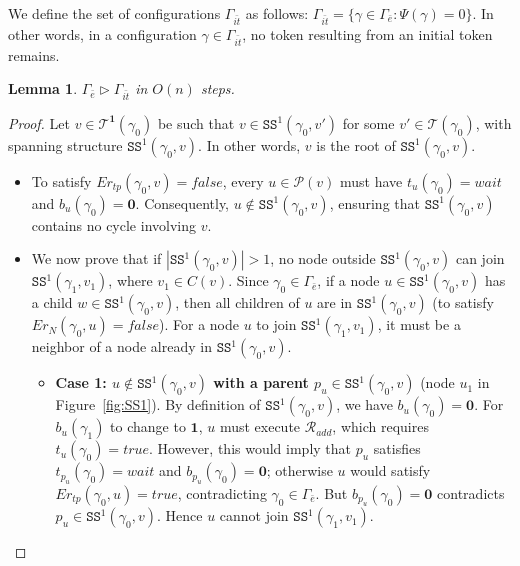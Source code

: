 \documentclass[a4paper, 12pt]{article}
\newtheorem{lemma}[theorem]{Lemma}
\newcommand{\Pa}{\mathcal{P}}
\newcommand{\bz}{\mathbf{0}}
\newcommand{\bo}{\mathbf{1}}
\newcommand{\Ss}{\texttt{SS}^1}
\newcommand{\Radd}{$\mathscr{R}_{add}$}
\begin{document}
We define the set of configurations $\Gamma_{\bar{it}}$ as follows: 
$\Gamma_{\bar{it}} = \{\gamma \in \Gamma_{\bar{e}} : \Psi(\gamma) = 0\}$. 
In other words, in a configuration $\gamma \in \Gamma_{\bar{it}}$, no token 
resulting from an initial token remains.

\begin{lemma}
\label{lem:CleanBadToken}
$\Gamma_{\bar{e}} \triangleright \Gamma_{\bar{it}}$ in $O(n)$ steps.
\end{lemma}

\begin{proof}
Let $v \in \mathcal{T}^{\bo}(\gamma_0)$ be such that 
$v \in \Ss(\gamma_0, v')$ for some $v' \in \mathcal{T}(\gamma_0)$, 
with spanning structure $\Ss(\gamma_0, v)$. In other words, $v$ 
is the root of $\Ss(\gamma_0, v)$.

\begin{itemize}

\item To satisfy $Er_{tp}(\gamma_0, v) = \mathit{false}$, every 
$u \in \Pa(v)$ must have $t_u(\gamma_0) = \mathit{wait}$ and 
$b_u(\gamma_0) = \bz$. Consequently, $u \notin \Ss(\gamma_0, v)$, 
ensuring that $\Ss(\gamma_0, v)$ contains no cycle involving $v$.

\item We now prove that if $|\Ss(\gamma_0, v)| > 1$, no node 
outside $\Ss(\gamma_0, v)$ can join $\Ss(\gamma_1, v_1)$, 
where $v_1 \in C(v)$. Since $\gamma_0 \in \Gamma_{\bar{e}}$, if a node 
$u \in \Ss(\gamma_0, v)$ has a child $w \in \Ss(\gamma_0, v)$, 
then all children of $u$ are in $\Ss(\gamma_0, v)$ (to satisfy 
$Er_{N}(\gamma_0, u) = \mathit{false}$). For a node $u$ to join 
$\Ss(\gamma_1, v_1)$, it must be a neighbor of a node already 
in $\Ss(\gamma_0, v)$.

\begin{itemize}

    \item \textbf{Case 1: $u \notin \Ss(\gamma_0, v)$ with a 
    parent $p_u \in \Ss(\gamma_0, v)$} (node $u_1$ in 
    Figure~\ref{fig:SS1}). By definition of $\Ss(\gamma_0, v)$, 
    we have $b_u(\gamma_0) = \bz$. For $b_u(\gamma_1)$ to change to 
    $\bo$, $u$ must execute \Radd, which requires $t_u(\gamma_0) = 
    \mathit{true}$. However, this would imply that $p_u$ satisfies 
    $t_{p_u}(\gamma_0) = \mathit{wait}$ and $b_{p_u}(\gamma_0) = \bz$; 
    otherwise $u$ would satisfy $Er_{tp}(\gamma_0, u) = \mathit{true}$, 
    contradicting $\gamma_0 \in \Gamma_{\bar{e}}$. But 
    $b_{p_u}(\gamma_0) = \bz$ contradicts $p_u \in \Ss(\gamma_0, v)$. 
    Hence $u$ cannot join $\Ss(\gamma_1, v_1)$.


\end{itemize}
\end{itemize}
\end{proof}
\end{document}
